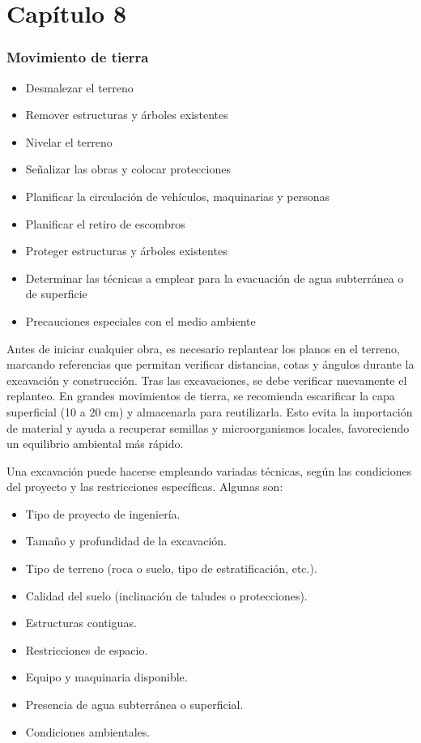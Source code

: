 \part{Capítulo 8}

\section{Movimiento de tierra}
\begin{itemize}
    \item Desmalezar el terreno
    \item Remover estructuras y árboles existentes
    \item Nivelar el terreno
    \item Señalizar las obras y colocar protecciones
    \item Planificar la circulación de vehículos, maquinarias y personas
    \item Planificar el retiro de escombros
    \item Proteger estructuras y árboles existentes
    \item Determinar las técnicas a emplear para la evacuación de agua subterránea o de superficie
    \item Precauciones especiales con el medio ambiente
\end{itemize}

Antes de iniciar cualquier obra, es necesario replantear los planos en el terreno, marcando referencias que permitan verificar distancias, cotas y ángulos durante la excavación y construcción. Tras las excavaciones, se debe verificar nuevamente el replanteo. En grandes movimientos de tierra, se recomienda escarificar la capa superficial (10 a 20 cm) y almacenarla para reutilizarla. Esto evita la importación de material y ayuda a recuperar semillas y microorganismos locales, favoreciendo un equilibrio ambiental más rápido.

Una excavación puede hacerse empleando variadas técnicas, según las condiciones del proyecto y las restricciones específicas. Algunas son:
\begin{itemize}
    \item Tipo de proyecto de ingeniería.
    \item Tamaño y profundidad de la excavación.
    \item Tipo de terreno (roca o suelo, tipo de estratificación, etc.).
    \item Calidad del suelo (inclinación de taludes o protecciones).
    \item Estructuras contiguas.
    \item Restricciones de espacio.
    \item Equipo y maquinaria disponible.
    \item Presencia de agua subterránea o superficial.
    \item Condiciones ambientales.
\end{itemize}


